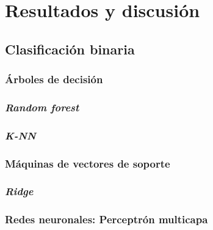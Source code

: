 \chapter{Resultados y discusión}
\label{ch:resultados}


\section{Clasificación binaria}
\label{sec:clas_binaria}


\subsection{Árboles de decisión}
\label{subsec:dt_bin}



\subsection{\textit{Random forest}}
\label{subsec:rf_bin}



\subsection{\textit{K-NN}}
\label{subsec:knn_bin}



\subsection{Máquinas de vectores de soporte}
\label{subsec:svm_bin}



\subsection{\textit{Ridge}}
\label{subsec:ridge_bin}



\subsection{Redes neuronales: Perceptrón multicapa}
\label{subsec:mlp_bin}



